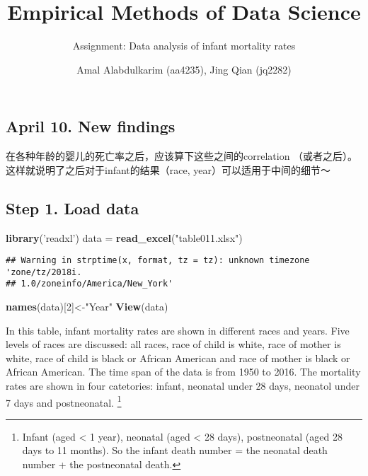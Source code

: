 \documentclass[]{article}
\title{Empirical Methods of Data Science}
\subtitle{Assignment: Data analysis of infant mortality rates}
\author{Amal Alabdulkarim (aa4235), Jing Qian (jq2282)}
\date{}
\newenvironment{Shaded}{\begin{snugshade}}{\end{snugshade}}
\newcommand{\DecValTok}[1]{\textcolor[rgb]{0.00,0.00,0.81}{#1}}
\newcommand{\KeywordTok}[1]{\textcolor[rgb]{0.13,0.29,0.53}{\textbf{#1}}}
\newcommand{\NormalTok}[1]{#1}
\newcommand{\StringTok}[1]{\textcolor[rgb]{0.31,0.60,0.02}{#1}}
\let\rmarkdownfootnote\footnote%
\def\footnote{\protect\rmarkdownfootnote}
\begin{document}
\maketitle

\hypertarget{april-10.-new-findings}{%
\subsection{April 10. New findings}\label{april-10.-new-findings}}

在各种年龄的婴儿的死亡率之后，应该算下这些之间的correlation
（或者之后）。这样就说明了之后对于infant的结果（race,
year）可以适用于中间的细节～

\hypertarget{step-1.-load-data}{%
\subsection{Step 1. Load data}\label{step-1.-load-data}}

\begin{Shaded}
\begin{Highlighting}[]
\KeywordTok{library}\NormalTok{(}\StringTok{'readxl'}\NormalTok{)}
\NormalTok{data =}\StringTok{ }\KeywordTok{read_excel}\NormalTok{(}\StringTok{"table011.xlsx"}\NormalTok{)}
\end{Highlighting}
\end{Shaded}

\begin{verbatim}
## Warning in strptime(x, format, tz = tz): unknown timezone 'zone/tz/2018i.
## 1.0/zoneinfo/America/New_York'
\end{verbatim}

\begin{Shaded}
\begin{Highlighting}[]
\KeywordTok{names}\NormalTok{(data)[}\DecValTok{2}\NormalTok{]<-}\StringTok{"Year"}
\KeywordTok{View}\NormalTok{(data)}
\end{Highlighting}
\end{Shaded}

In this table, infant mortality rates are shown in different races and
years. Five levels of races are discussed: all races, race of child is
white, race of mother is white, race of child is black or African
American and race of mother is black or African American. The time span
of the data is from 1950 to 2016. The mortality rates are shown in four
catetories: infant, neonatal under 28 days, neonatol under 7 days and
postneonatal. \footnote{Infant (aged \textless{} 1 year), neonatal (aged
  \textless{} 28 days), postneonatal (aged 28 days to 11 months). So the
  infant death number = the neonatal death number + the postneonatal
  death.}
\end{document}
